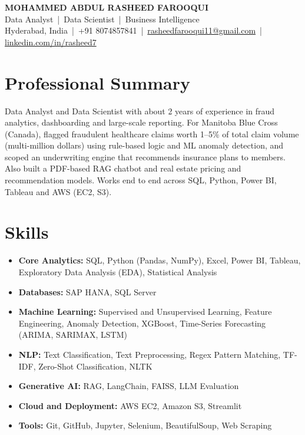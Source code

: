 \documentclass[10pt,a4paper]{article}
\begin{document}
\begin{center}
  {\LARGE\bfseries MOHAMMED ABDUL RASHEED FAROOQUI}\\[3pt]
  {\large Data Analyst \,|\, Data Scientist \,|\, Business Intelligence}\\[3pt]
  Hyderabad, India \,|\, +91 8074857841 \,|\,
  \href{mailto:rasheedfarooqui11@gmail.com}{rasheedfarooqui11@gmail.com} \,|\,
  \href{https://linkedin.com/in/rasheed7}{linkedin.com/in/rasheed7}
\end{center}

\section{Professional Summary}
Data Analyst and Data Scientist with about 2 years of experience in fraud analytics, dashboarding and
large-scale reporting. For Manitoba Blue Cross (Canada), flagged fraudulent healthcare claims worth 1--5\% of
total claim volume (multi-million dollars) using rule-based logic and ML anomaly detection, and scoped an
underwriting engine that recommends insurance plans to members. Also built a PDF-based RAG chatbot and
real estate pricing and recommendation models. Works end to end across SQL, Python, Power BI, Tableau and
AWS (EC2, S3).

\section{Skills}
\begin{itemize}
  \item \textbf{Core Analytics:} SQL, Python (Pandas, NumPy), Excel, Power BI, Tableau, Exploratory Data Analysis (EDA), Statistical Analysis
  \item \textbf{Databases:} SAP HANA, SQL Server
  \item \textbf{Machine Learning:} Supervised and Unsupervised Learning, Feature Engineering, Anomaly Detection, XGBoost, Time-Series Forecasting (ARIMA, SARIMAX, LSTM)
  \item \textbf{NLP:} Text Classification, Text Preprocessing, Regex Pattern Matching, TF-IDF, Zero-Shot Classification, NLTK
  \item \textbf{Generative AI:} RAG, LangChain, FAISS, LLM Evaluation
  \item \textbf{Cloud and Deployment:} AWS EC2, Amazon S3, Streamlit
  \item \textbf{Tools:} Git, GitHub, Jupyter, Selenium, BeautifulSoup, Web Scraping
\end{itemize}
\end{document}

